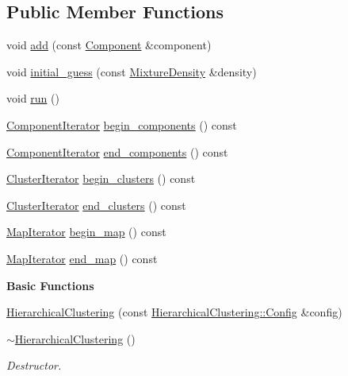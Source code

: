 \subsection*{Public Member Functions}
\begin{DoxyCompactItemize}
\item 
void \hyperlink{classeos_1_1HierarchicalClustering_ae42a0dd678f5258605a225a4b53eb487}{add} (const \hyperlink{classeos_1_1HierarchicalClustering_1_1Component}{Component} \&component)
\item 
void \hyperlink{classeos_1_1HierarchicalClustering_af11950c9657fcfaf1962b3945e5feef6}{initial\_\-guess} (const \hyperlink{classeos_1_1HierarchicalClustering_aa51668b14931e2a8b1697c8f26a8f1c8}{MixtureDensity} \&density)
\item 
void \hyperlink{classeos_1_1HierarchicalClustering_aff7df5f12bd5ddb276896cc43c597981}{run} ()
\item 
\hyperlink{classeos_1_1WrappedForwardIterator}{ComponentIterator} \hyperlink{classeos_1_1HierarchicalClustering_a34dc8e608ce186011554a7e108216b78}{begin\_\-components} () const 
\item 
\hyperlink{classeos_1_1WrappedForwardIterator}{ComponentIterator} \hyperlink{classeos_1_1HierarchicalClustering_ac834886e174350d4cf0a69fd88916b8c}{end\_\-components} () const 
\item 
\hyperlink{classeos_1_1WrappedForwardIterator}{ClusterIterator} \hyperlink{classeos_1_1HierarchicalClustering_ac30248ba80ef8483617c6d0b3cc84e98}{begin\_\-clusters} () const 
\item 
\hyperlink{classeos_1_1WrappedForwardIterator}{ClusterIterator} \hyperlink{classeos_1_1HierarchicalClustering_a071a4d95afc77934d1af8c57050e49cb}{end\_\-clusters} () const 
\item 
\hyperlink{classeos_1_1WrappedForwardIterator}{MapIterator} \hyperlink{classeos_1_1HierarchicalClustering_a2b2ea33a67b4e8f66ab8b6e4dd6a6710}{begin\_\-map} () const 
\item 
\hyperlink{classeos_1_1WrappedForwardIterator}{MapIterator} \hyperlink{classeos_1_1HierarchicalClustering_a022c09b9e8072a404b659e5a482937f8}{end\_\-map} () const 
\end{DoxyCompactItemize}
\begin{Indent}{\bf Basic Functions}\par
{\em \label{_amgrp2386c9a1f1785edee33f374dd2db9b3d}
 }\begin{DoxyCompactItemize}
\item 
\hyperlink{classeos_1_1HierarchicalClustering_a7b4792a338b8e9ed7eff4c50b69a6e2f}{HierarchicalClustering} (const \hyperlink{classeos_1_1HierarchicalClustering_1_1Config}{HierarchicalClustering::Config} \&config)
\item 
\hyperlink{classeos_1_1HierarchicalClustering_a65264d9ee6f203a8ca040644df99bf65}{$\sim$HierarchicalClustering} ()
\begin{DoxyCompactList}\small\item\em Destructor. \item\end{DoxyCompactList}\end{DoxyCompactItemize}
\end{Indent}


